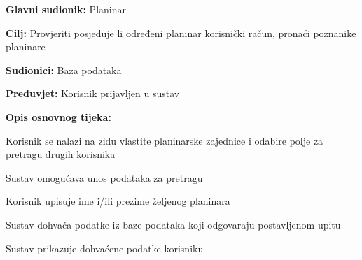 		\noindent {}
		\begin{packed_item}
			
			\item \textbf{Glavni sudionik: }$ $Planinar$ $
			\item  \textbf{Cilj:} $ $Provjeriti posjeduje li određeni planinar korisnički račun, pronaći poznanike planinare$ $
			\item  \textbf{Sudionici:} $ $Baza podataka$ $
			\item  \textbf{Preduvjet:} $ $Korisnik prijavljen u sustav$ $
			\item  \textbf{Opis osnovnog tijeka:}
			
			\item[] \begin{packed_enum}
				
				\item $ $Korisnik se nalazi na zidu vlastite planinarske zajednice i odabire polje za pretragu drugih korisnika$ $
				\item $ $Sustav omogućava unos podataka za pretragu$ $
				\item $ $Korisnik upisuje ime i/ili prezime željenog planinara$ $	
				\item $ $Sustav dohvaća podatke iz baze podataka koji odgovaraju postavljenom upitu$ $
				\item $ $Sustav prikazuje dohvaćene podatke korisniku $ $
			\end{packed_enum}
		\end{packed_item}
	
	
